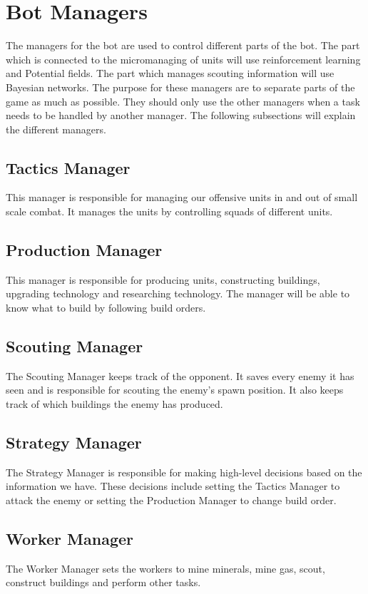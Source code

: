 \section{Bot Managers}
	\label{design::managers}
	The managers for the bot are used to control different parts of the bot. The part which is connected to the micromanaging of units will use 
	reinforcement learning and Potential fields. The part which manages scouting information will use Bayesian networks. 
	The purpose for these managers are to separate parts of the game as much as possible. They should only use the other managers when a task needs to be handled 
	by another manager. The following subsections will explain the different managers.
	
	\subsection*{Tactics Manager}
		This manager is responsible for managing our offensive units in and out of small scale combat. 
		It manages the units by controlling squads of different units.
	\subsection*{Production Manager}
		This manager is responsible for producing units, constructing buildings, upgrading technology and researching technology. The manager will be able to 
		know what to build by following build orders.
	\subsection*{Scouting Manager}
		The Scouting Manager keeps track of the opponent. 
		It saves every enemy it has seen and is responsible for scouting the enemy's spawn position. 
		It also keeps track of which buildings the enemy has produced.
	\subsection*{Strategy Manager}
		The Strategy Manager is responsible for making high-level decisions based on the information we have. These decisions include
		setting the Tactics Manager to attack the enemy or setting the Production Manager to change build order.
	\subsection*{Worker Manager}
		The Worker Manager sets the workers to mine minerals, mine gas, scout, construct buildings and perform other tasks.
